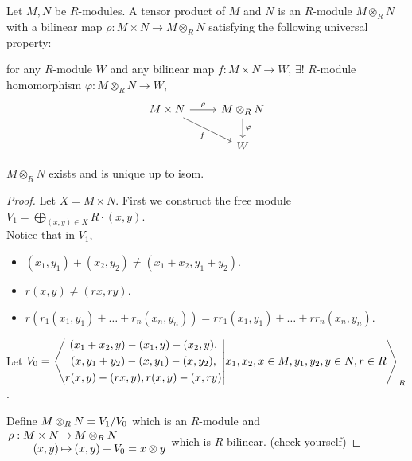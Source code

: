 \begin{definition}
  Let $M, N$ be $R$-modules. A tensor product of $M$ and $N$ is an $R$-module
  $M \otimes_R N$ with a bilinear map $\rho: M\times N \to M\otimes_R N$
  satisfying the following universal property:

  for any $R$-module $W$ and any bilinear map $f: M\times N \to W$,
  $\exists!$ $R$-module homomorphism $\varphi: M \otimes_R N \to W$,
  \[
    \begin{tikzcd}
    M\times N \arrow{r}{\rho} \arrow[swap]{dr}{f}
      & M \otimes_R N \arrow{d}{\varphi} \\
    & W
    \end{tikzcd}
  \]
\end{definition}

\begin{theorem}
  $M \otimes_R N$ exists and is unique up to isom.
  \begin{proof}
    Let $X = M\times N$.
    First we construct the free module
    $\displaystyle V_1 = \bigoplus_{(x, y) \in X} R \cdot (x, y)$. \\
    Notice that in $V_1$,
    \begin{itemize}
      \item $(x_1, y_1) + (x_2, y_2) \ne (x_1+x_2, y_1+y_2)$.
      \item $r(x, y) \ne (rx, ry)$.
      \item $r(r_1(x_1, y_1) + \dots + r_n(x_n, y_n)) =
        rr_1(x_1, y_1) + \dots + rr_n(x_n, y_n)$.
    \end{itemize}
    Let $V_0 = \gen*{
      \begin{gathered}
        (x_1+x_2, y) - (x_1, y) - (x_2, y), \\
        (x, y_1+y_2) - (x, y_1) - (x, y_2), \\
        r(x, y) - (rx, y), r(x, y) - (x, ry)
      \end{gathered}
      \middle| x_1, x_2, x \in M, y_1, y_2, y \in N, r \in R
    }_R$.

    Define $M \otimes_R N = \quot{V_1}{V_0}$ which is an $R$-module and
    $\arraycolsep=1pt
    \begin{array}{rcl}
      \rho: M \times N & \to & M \otimes_R N \\
      (x, y) & \mapsto & (x, y) + V_0 = x \otimes y
    \end{array}$
    which is $R$-bilinear. (check yourself)


\end{proof}
\end{theorem}
